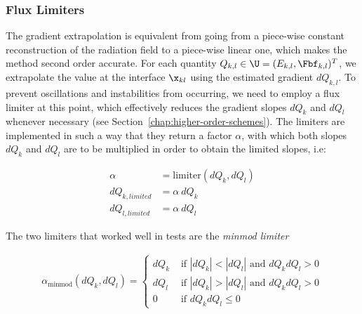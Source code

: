 \subsubsection{Flux Limiters}

The gradient extrapolation is equivalent from going from a piece-wise constant reconstruction of the radiation field to a piece-wise linear one, which makes the method second order accurate.
For each quantity $Q_{k,l} \in \U = (E_{k,l}, \Fbf_{k,l})^T$, we extrapolate the value at the
interface $\x_{kl}$ using the estimated gradient $dQ_{k,l}$. To prevent oscillations and
instabilities from occurring, we need to employ a flux limiter at this point, which effectively
reduces the gradient slopes $dQ_k$ and $dQ_l$ whenever necessary  (see
Section~\ref{chap:higher-order-schemes}). The limiters are implemented in such a way that they
return a factor $\alpha$, with which both slopes $dQ_k$ and $dQ_l$ are to be multiplied in order to
obtain the limited slopes, i.e:

\begin{align}
	\alpha &= \text{limiter}(dQ_k, dQ_l)\\
	dQ_{k, limited} &= \alpha\ dQ_k\\
	dQ_{l, limited} &= \alpha\ dQ_l
\end{align}

The two limiters that worked well in tests are the \emph{minmod limiter}

\begin{align}
    \alpha_{\text{minmod}}(dQ_k, dQ_l) =
    \begin{cases}
      dQ_k      & \text{ if } |dQ_k| < |dQ_l| \text{ and } dQ_k dQ_l > 0 \\
      dQ_l      & \text{ if } |dQ_k| > |dQ_l| \text{ and } dQ_k dQ_l > 0 \\
      0         & \text{ if }  dQ_k dQ_l \leq 0
    \end{cases} \label{eq:rt-minmod}
\end{align}

